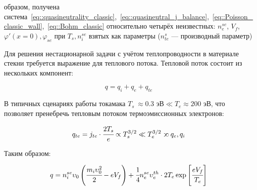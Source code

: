  образом, получена система~\eqref{eq::quasineutrality_classic},~\eqref{eq::quasineutral_j_balance},~\eqref{eq::Poisson_classic_wall},~\eqref{eq::Bohm_classic} относительно четырёх неизвестных: $n_e^{se}$, 
$V_f$, $\varphi'(x = 0), \varphi_{se}$ при $T_s, n_i^{se}$ взятых как параметры ($n_{te}^s$ --- производный параметр)

Для решения нестационарной задачи с учётом теплопроводности в материале стекни требуется выражение для теплового потока.
Тепловой поток состоит из нескольких компонент:

\begin{equation}
    q = q_i + q_e + q_{te}
\end{equation}

В типичных сценариях работы токамака $T_s ~\approx0.3\text{ эВ} \ll T_e \approx 200\text{ эВ}$, что позволяет пренебречь 
тепловым потоком термоэмиссионных электронов:

\begin{equation}
    q_{te} = j_{te}\cdot\cfrac{2T_s}{e} \propto T_s^{3/2} \ll T_e^{3/2} \proptoinverse q_e,q_i
\end{equation}

Таким образом:

\begin{equation}
    q = n_i^{se}\upsilon_0\left(\cfrac{m_i\upsilon_0^2}{2} - eV_f\right) + \cfrac{1}{4}n_e^{se}\upsilon_e^{th}\cdot2T_e\exp\left[\cfrac{eV_f}{T_e}\right]
\end{equation}
